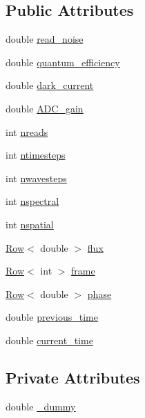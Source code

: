 \subsection*{Public Attributes}
\begin{DoxyCompactItemize}
\item 
double \hyperlink{classDetector_a8eca17062f19ec98b728af67752abf6f}{read\_\-noise}
\item 
double \hyperlink{classDetector_a4a830152b9beb393e26f8f2e26fda464}{quantum\_\-efficiency}
\item 
double \hyperlink{classDetector_a8c0b7234e4b96407d8648a42efec4371}{dark\_\-current}
\item 
double \hyperlink{classDetector_adb18913ba2480228ee13611040ad7bfe}{ADC\_\-gain}
\item 
int \hyperlink{classDetector_aab6efccaea99c3467b6e0082a7922cb8}{nreads}
\item 
int \hyperlink{classDetector_ada81397b9b56b728a7a6d20b48d40e2d}{ntimesteps}
\item 
int \hyperlink{classDetector_aa5e5de28e589cc3cee8ee535ba03d34a}{nwavesteps}
\item 
int \hyperlink{classDetector_a83edf838e8d00d2286e2e75f54836601}{nspectral}
\item 
int \hyperlink{classDetector_ad0d59d1328b59ce6c13f49361b50ac29}{nspatial}
\item 
\hyperlink{classRow}{Row}$<$ double $>$ \hyperlink{classDetector_ac6809aa9b8d5acee17ce16353599d557}{flux}
\item 
\hyperlink{classRow}{Row}$<$ int $>$ \hyperlink{classDetector_a5082e9a99cae04f03cba0223a0593053}{frame}
\item 
\hyperlink{classRow}{Row}$<$ double $>$ \hyperlink{classDetector_a434d34a6f28382fff13111fbb8c1b6a9}{phase}
\item 
double \hyperlink{classDetector_a2cb4ca9c009f4465404af3bd4d943788}{previous\_\-time}
\item 
double \hyperlink{classDetector_a7d1a73b930a0cdc646e9d5e7a75f28e7}{current\_\-time}
\end{DoxyCompactItemize}
\subsection*{Private Attributes}
\begin{DoxyCompactItemize}
\item 
double \hyperlink{classDetector_a2497faae45fc3b55e67c997f2b4cd29f}{\_\-dummy}
\end{DoxyCompactItemize}


